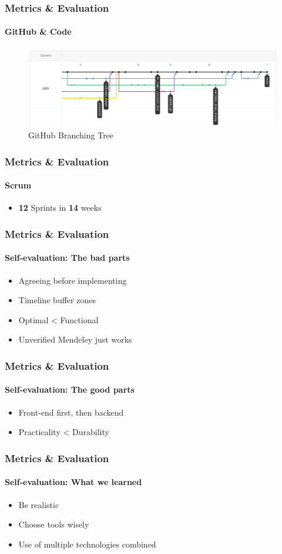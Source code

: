 \documentclass{beamer}
\begin{document}
\begin{frame}
\frametitle{Metrics \& Evaluation}
\framesubtitle{GitHub \& Code}
	\begin{figure}
		\includegraphics[scale=0.3]{./images/github_tree.png}
		\caption{GitHub Branching Tree}
	\end{figure}
\end{frame}

\begin{frame}
\frametitle{Metrics \& Evaluation}
\framesubtitle{Scrum}
	\begin{itemize}
	 \item \textbf{12} Sprints in \textbf{14} weeks
	\end{itemize}
\end{frame}

\begin{frame}
\frametitle{Metrics \& Evaluation}
\framesubtitle{Self-evaluation: The bad parts}
	\begin{itemize}
	 \item Agreeing before implementing
	 \item Timeline buffer zones
	 \item Optimal < Functional
	 \item Unverified Mendeley just works
	\end{itemize}
\end{frame}

\begin{frame}
\frametitle{Metrics \& Evaluation}
\framesubtitle{Self-evaluation: The good parts}
	\begin{itemize}
	 \item Front-end first, then backend
	 \item Practicality < Durability
	\end{itemize}
\end{frame}

\begin{frame}
\frametitle{Metrics \& Evaluation}
\framesubtitle{Self-evaluation: What we learned}
	\begin{itemize}
	 \item Be realistic
	 \item Choose tools wisely
	 \item Use of multiple technologies combined
	\end{itemize}
\end{frame}
\end{document}
